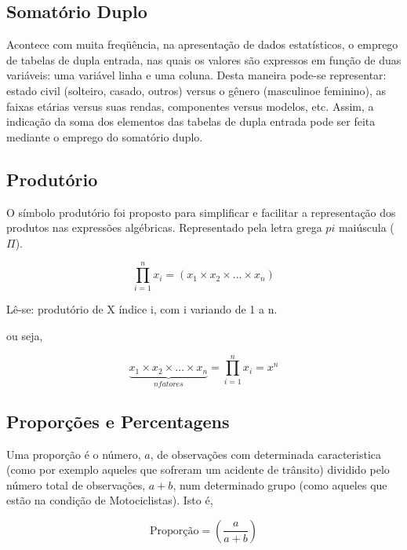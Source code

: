 \newpage
\subsection{Somatório Duplo}

Acontece com muita freqüência, na apresentação de dados estatísticos, o emprego de tabelas de dupla entrada, nas quais os valores são expressos em função de duas variáveis: uma variável linha e uma coluna. Desta maneira pode-se representar: estado civil (solteiro, casado, outros) versus o gênero (masculinoe feminino), as faixas etárias versus suas rendas, componentes versus modelos, etc. Assim, a indicação da soma dos elementos das tabelas de dupla entrada pode ser feita mediante o emprego do somatório duplo.\vskip0.3cm


\subsection{Produtório}

O símbolo produtório foi proposto para simplificar e facilitar a representação dos produtos nas expressões algébricas. Representado pela letra grega $pi$ maiúscula ($\Pi$).


\begin{equation}\label{}
\prod_{i=1}^{n}x_{i} = (x_{1} \times x_{2} \times  \ldots \times x_{n})
\end{equation}


Lê-se: produtório de X índice i, com i variando de 1 a n.

\vskip0.3cm

ou seja,

\begin{equation}\label{}
\underbrace{x_{1} \times x_{2} \times  \ldots \times x_{n}}_{n fatores}= \prod_{i=1}^{n}x_{i}= x^{n}
\end{equation}



\subsection{Proporções e Percentagens}


Uma proporção é o número, $a$, de observações com determinada caracteristica (como por exemplo aqueles que sofreram um acidente de trânsito) dividido pelo número total de observações, $a+b$, num determinado grupo (como aqueles que estão na condição de Motociclistas). Isto é,


$$ 
\mbox{Proporção} = \left( \frac{a}{a+b} \right)
$$


